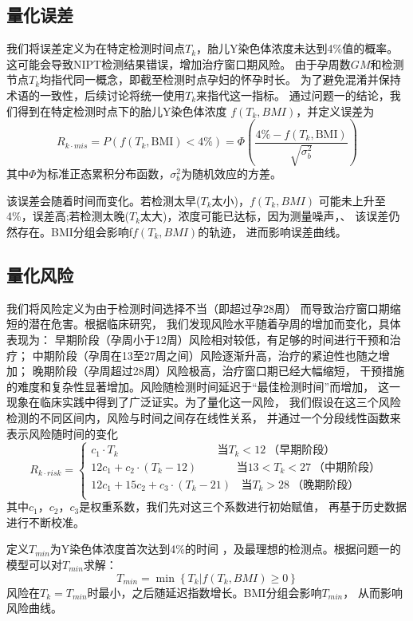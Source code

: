 \documentclass[withoutpreface,bwprint]{cumcmthesis} %
\begin{document}
\subsection{量化误差}
我们将误差定义为在特定检测时间点$T_k$，胎儿Y染色体浓度未达到4\%值的概率。
这可能会导致NIPT检测结果错误，增加治疗窗口期风险。
由于孕周数$GM$和检测节点$T_k$均指代同一概念，即截至检测时点孕妇的怀孕时长。
为了避免混淆并保持术语的一致性，后续讨论将统一使用$T_k$来指代这一指标。
通过问题一的结论，我们得到在特定检测时点下的胎儿Y染色体浓度
$f\left( T_k,BMI \right)$，并定义误差为
\begin{equation}
R_{k\cdot mis}=P\left( f\left( T_k,\text{BMI} \right) <4\% \right) =\Phi \left( \frac{4\%-f\left( T_k,\text{BMI} \right)}{\sqrt{\sigma _b^2}} \right) 
\end{equation}
其中$\varPhi$为标准正态累积分布函数，$\sigma _b^2$为随机效应的方差。\par
该误差会随着时间而变化。若检测太早($T_k$太小)，$f\left( T_k,BMI \right)$
可能未上升至4\%，误差高;若检测太晚($T_k$太大)，浓度可能已达标，因为测量噪声，、
该误差仍然存在。BMI分组会影响f$f\left( T_k,BMI \right)$的轨迹，
进而影响误差曲线。

\subsection{量化风险}
我们将风险定义为由于检测时间选择不当（即超过孕28周）
而导致治疗窗口期缩短的潜在危害。根据临床研究，
我们发现风险水平随着孕周的增加而变化，具体表现为：
早期阶段（孕周小于12周）风险相对较低，有足够的时间进行干预和治疗；
中期阶段（孕周在13至27周之间）风险逐渐升高，治疗的紧迫性也随之增加；
晚期阶段（孕周超过28周）风险极高，治疗窗口期已经大幅缩短，
干预措施的难度和复杂性显著增加。风险随检测时间延迟于“最佳检测时间”而增加，
这一现象在临床实践中得到了广泛证实。为了量化这一风险，
我们假设在这三个风险检测的不同区间内，风险与时间之间存在线性关系，
并通过一个分段线性函数来表示风险随时间的变化
\begin{equation}
R_{k\cdot risk}=\left\{ \begin{array}{l}
	c_1\cdot T_k\ \ \ \ \ \ \ \ \ \ \ \ \ \ \ \ \ \ \ \ \ \ \ \ \ \ \ \ \ \ \ \ \ \ \ \ \ \ \ \ \text{当}T_k<12\ \text{（早期阶段）}\\
	12c_1+c_2\cdot \left( T_k-12 \right) \ \ \ \ \ \ \ \ \ \ \ \ \ \ \ \ \text{当}13<T_k<27\ \text{（中期阶段）}\\
	12c_1+15c_2+c_3\cdot \left( T_k-21 \right) \ \ \ \ \text{当}T_k>28\ \text{（晚期阶段）}\\
\end{array} \right.   
\end{equation}
其中$c_1$，$c_2$，$c_3$是权重系数，我们先对这三个系数进行初始赋值，
再基于历史数据进行不断校准。\par
定义$T_{min}$为Y染色体浓度首次达到4\%的时间
，及最理想的检测点。根据问题一的模型可以对$T_{min}$求解：
$$
T_{min}=\min \left\{ T_k|f\left( T_k,BMI \right) \ge 0 \right\} 
$$
风险在$T_k=T_{min}$时最小，之后随延迟指数增长。BMI分组会影响$T_{min}$，
从而影响风险曲线。
\end{document}
